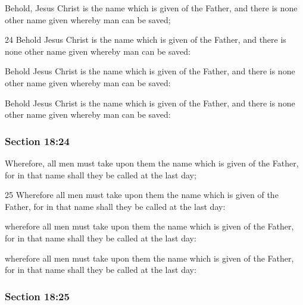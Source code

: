 		Behold, Jesus Christ is the name which is given of the Father, and there is none other name given whereby man can be saved;

		\begin{framed}
		\scriptsize
			\begin{compactdesc}
				\item[JSP] 24 Behold Jesus Christ is the name which is given of the Father, and there is none other name given whereby man can be saved:
				\item[DC 1835] Behold Jesus Christ is the name which is given of the Father, and there is none other name given whereby man can be saved: 
				\item[DC 1844] Behold Jesus Christ is the name which is given of the Father, and there is none other name given whereby man can be saved: 
			\end{compactdesc}
		\end{framed}

	\subsubsection{Section 18:24} %
		\label{DC18-24}

		Wherefore, all men must take upon them the name which is given of the Father, for in that name shall they be called at the last day;

		\begin{framed}
		\scriptsize
			\begin{compactdesc}
				\item[JSP] 25 Wherefore all men must take upon them the name which is given of the Father, for in that name shall they be called at the last day:
				\item[DC 1835] wherefore all men must take upon them the name which is given of the Father, for in that name shall they be called at the last day: 
				\item[DC 1844] wherefore all men must take upon them the name which is given of the Father, for in that name shall they be called at the last day: 
			\end{compactdesc}
		\end{framed}

	\subsubsection{Section 18:25} %
		\label{DC18-25}

